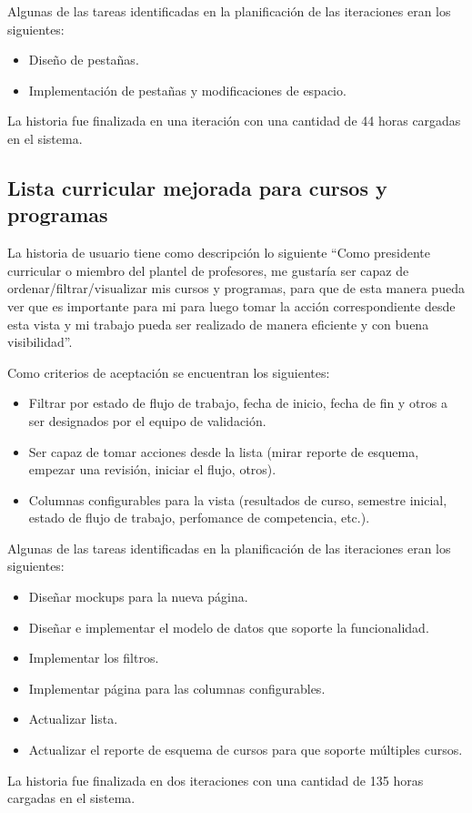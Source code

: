Algunas de las tareas identificadas en la planificación de las iteraciones eran los siguientes:
\begin{itemize}
	\item Diseño de pestañas.
	\item Implementación de pestañas y modificaciones de espacio.
\end{itemize}

La historia fue finalizada en una iteración con una cantidad de 44 horas cargadas en el sistema.


\subsection{Lista curricular mejorada para cursos y programas}
La historia de usuario tiene como descripción lo siguiente \enquote{Como presidente curricular o miembro del plantel de profesores, me gustaría ser capaz de ordenar/filtrar/visualizar mis cursos y programas, para que de esta manera pueda ver que es importante para mi para luego tomar la acción correspondiente desde esta vista y mi trabajo pueda ser realizado de manera eficiente y con buena visibilidad}.

Como criterios de aceptación se encuentran los siguientes:
\begin{itemize}
	\item Filtrar por estado de flujo de trabajo, fecha de inicio, fecha de fin y otros a ser designados por el equipo de validación.
	\item Ser capaz de tomar acciones desde la lista (mirar reporte de esquema, empezar una revisión, iniciar el flujo, otros).
	\item Columnas configurables para la vista (resultados de curso, semestre inicial, estado de flujo de trabajo, perfomance de competencia, etc.).
\end{itemize}

Algunas de las tareas identificadas en la planificación de las iteraciones eran los siguientes:
\begin{itemize}
	\item Diseñar mockups para la nueva página.
	\item Diseñar e implementar el modelo de datos que soporte la funcionalidad.
	\item Implementar los filtros.
	\item Implementar página para las columnas configurables.
	\item Actualizar lista.
	\item Actualizar el reporte de esquema de cursos para que soporte múltiples cursos.
\end{itemize}

La historia fue finalizada en dos iteraciones con una cantidad de 135 horas cargadas en el sistema.